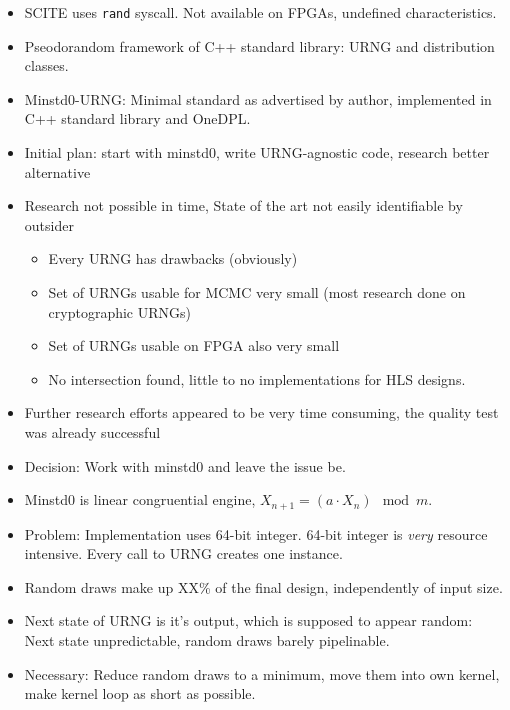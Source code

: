 \begin{itemize}
    \item SCITE uses \texttt{rand} syscall. Not available on FPGAs, undefined characteristics.
    \item Pseodorandom framework of C++ standard library: URNG and distribution classes.
    \item Minstd0-URNG: Minimal standard as advertised by author, implemented in C++ standard library and OneDPL.
    \item Initial plan: start with minstd0, write URNG-agnostic code, research better alternative
    \item Research not possible in time, State of the art not easily identifiable by outsider
    \begin{itemize}
        \item Every URNG has drawbacks (obviously)
        \item Set of URNGs usable for MCMC very small (most research done on cryptographic URNGs)
        \item Set of URNGs usable on FPGA also very small
        \item No intersection found, little to no implementations for HLS designs.
    \end{itemize}
    \item Further research efforts appeared to be very time consuming, the quality test was already successful
    \item Decision: Work with minstd0 and leave the issue be.
    \item Minstd0 is linear congruential engine, $X_{n+1} = (a \cdot X_n) \mod m$.
    \item Problem: Implementation uses 64-bit integer. 64-bit integer is \emph{very} resource intensive. Every call to URNG creates one instance.
    \item Random draws make up XX\% of the final design, independently of input size.
    \item Next state of URNG is it's output, which is supposed to appear random: Next state unpredictable, random draws barely pipelinable.
    \item Necessary: Reduce random draws to a minimum, move them into own kernel, make kernel loop as short as possible.
\end{itemize}